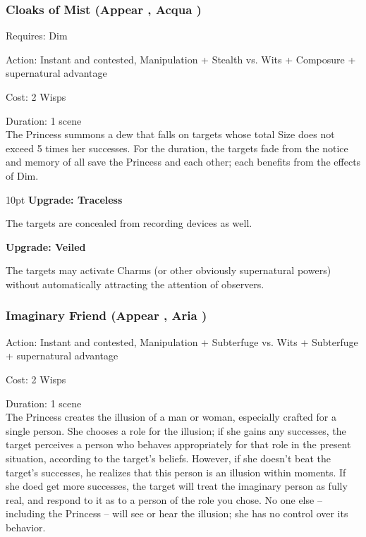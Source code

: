 \subsubsection*{Cloaks of Mist (Appear \textbullet\textbullet\textbullet\textbullet, Acqua \textbullet\textbullet\textbullet)}

\noindent Requires: Dim

\noindent Action: Instant and contested, Manipulation + Stealth vs. Wits + Composure + supernatural advantage

\noindent Cost: 2 Wisps

\noindent Duration: 1 scene \\

\noindent The Princess summons a dew that falls on targets whose total Size does not exceed 5 times her successes. For the duration, the targets fade from the notice and memory of all save the Princess and each other; each benefits from the effects of Dim.

\begin{myindentpar}{10pt} \textbf{Upgrade: Traceless}

The targets are concealed from recording devices as well.

\textbf{Upgrade: Veiled}

The targets may activate Charms (or other obviously supernatural powers) without automatically attracting the attention of observers.\end{myindentpar}

\subsubsection*{Imaginary Friend (Appear \textbullet\textbullet\textbullet\textbullet, Aria \textbullet\textbullet\textbullet)}

\noindent Action: Instant and contested, Manipulation + Subterfuge vs. Wits + Subterfuge + supernatural advantage

\noindent Cost: 2 Wisps

\noindent Duration: 1 scene\\

\noindent The Princess creates the illusion of a man or woman, especially crafted for a single person. She chooses a role for the illusion; if she gains any successes, the target perceives a person who behaves appropriately for that role in the present situation, according to the target's beliefs. However, if she doesn't beat the target's successes, he realizes that this person is an illusion within moments. If she doed get more successes, the target will treat the imaginary person as fully real, and respond to it as to a person of the role you chose. No one else -- including the Princess -- will see or hear the illusion; she has no control over its behavior.

